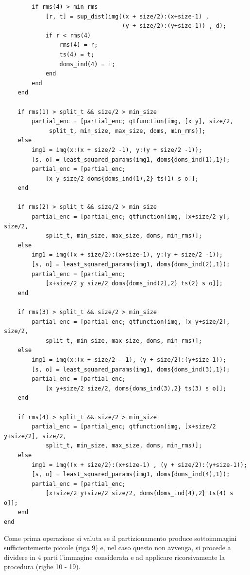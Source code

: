\documentclass[11pt,a4paper,appendixprefix=true,numbers=noenddot]{scrreprt}
\begin{document}
\begin{verbatim}
        if rms(4) > min_rms
            [r, t] = sup_dist(img((x + size/2):(x+size-1) , 
                                  (y + size/2):(y+size-1)) , d);
            if r < rms(4)
                rms(4) = r;
                ts(4) = t;
                doms_ind(4) = i;
            end
        end        
    end

    if rms(1) > split_t && size/2 > min_size
        partial_enc = [partial_enc; qtfunction(img, [x y], size/2,
             split_t, min_size, max_size, doms, min_rms)];
    else
        img1 = img(x:(x + size/2 -1), y:(y + size/2 -1));
        [s, o] = least_squared_params(img1, doms{doms_ind(1),1});
        partial_enc = [partial_enc; 
            [x y size/2 doms{doms_ind(1),2} ts(1) s o]];
    end

    if rms(2) > split_t && size/2 > min_size
        partial_enc = [partial_enc; qtfunction(img, [x+size/2 y], size/2, 
            split_t, min_size, max_size, doms, min_rms)];
    else
        img1 = img((x + size/2):(x+size-1), y:(y + size/2 -1));
        [s, o] = least_squared_params(img1, doms{doms_ind(2),1});
        partial_enc = [partial_enc; 
            [x+size/2 y size/2 doms{doms_ind(2),2} ts(2) s o]];
    end

    if rms(3) > split_t && size/2 > min_size
        partial_enc = [partial_enc; qtfunction(img, [x y+size/2], size/2, 
            split_t, min_size, max_size, doms, min_rms)];
    else
        img1 = img(x:(x + size/2 - 1), (y + size/2):(y+size-1));
        [s, o] = least_squared_params(img1, doms{doms_ind(3),1});
        partial_enc = [partial_enc; 
            [x y+size/2 size/2, doms{doms_ind(3),2} ts(3) s o]];
    end

    if rms(4) > split_t && size/2 > min_size
        partial_enc = [partial_enc; qtfunction(img, [x+size/2 y+size/2], size/2, 
            split_t, min_size, max_size, doms, min_rms)];
    else
        img1 = img((x + size/2):(x+size-1) , (y + size/2):(y+size-1));
        [s, o] = least_squared_params(img1, doms{doms_ind(4),1});
        partial_enc = [partial_enc; 
            [x+size/2 y+size/2 size/2, doms{doms_ind(4),2} ts(4) s o]];
    end
end
\end{verbatim}

Come prima operazione si valuta se il partizionamento produce sottoimmagini sufficientemente piccole (riga 9) e, nel caso questo non avvenga, si procede a dividere in 4 parti l'immagine considerata e ad applicare ricorsivamente la procedura (righe 10 - 19). 
\end{document}
